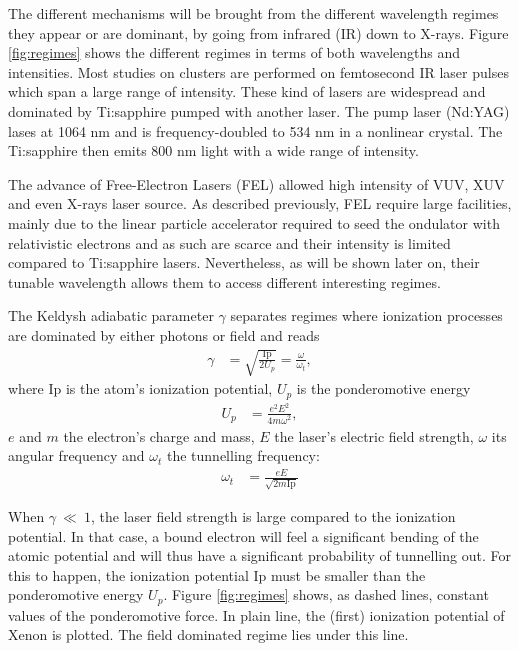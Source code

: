 The different mechanisms
%
will be brought from %
%
the different wavelength regimes
they appear or are dominant, by going from infrared (IR) down to X-rays. Figure
\ref{fig:regimes} shows the different regimes in terms of both wavelengths and
intensities. Most studies on clusters are performed on femtosecond IR laser
pulses which span a large range of intensity. These kind of lasers are
widespread and dominated by Ti:sapphire pumped with another laser. The pump
laser (Nd:YAG) lases at 1064 nm and is frequency-doubled to 534 nm in a
nonlinear crystal. The Ti:sapphire then emits 800 nm light with a wide range of
intensity.

The advance of Free-Electron Lasers (FEL) allowed high intensity of VUV, XUV and
even X-rays laser source. As described previously, FEL require large facilities,
mainly due to the linear particle accelerator required to seed the ondulator
with relativistic electrons and as such are scarce and their intensity is limited
compared to Ti:sapphire lasers. Nevertheless, as will be shown later on, their
tunable wavelength allows them to access different interesting regimes.

The Keldysh adiabatic parameter $\gamma$ separates regimes where
%
ionization
%
processes are
dominated by either photons or field\cite{Long2010} and reads
\begin{align}
\gamma & = \sqrt{ \frac{\textrm{Ip}}{2 U_p} } = \frac{\omega}{\omega_t},
\end{align}
where Ip is the atom's ionization potential, $U_p$ is the ponderomotive energy
\begin{align}
U_p & = \frac{e^2 E^2}{4 m \omega^2},
\end{align}
$e$ and $m$ the electron's charge and mass, $E$ the laser's electric field
strength, $\omega$ its angular frequency and $\omega_t$ the tunnelling
frequency:
\begin{align}
\omega_t & = \frac{e E}{\sqrt{2 m \textrm{Ip}}}
\end{align}


When $\gamma~\ll~1$, the laser field strength is large compared to the ionization
potential. In that case, a bound electron will feel a significant bending of the
atomic potential and will thus have a significant probability of tunnelling out.
For this to happen, the ionization potential Ip must be
smaller than the ponderomotive energy $U_p$. Figure \ref{fig:regimes} shows,
as dashed lines, constant values of the ponderomotive force. In plain line,
the (first) ionization potential of Xenon is plotted. The field dominated regime
lies under this line.

